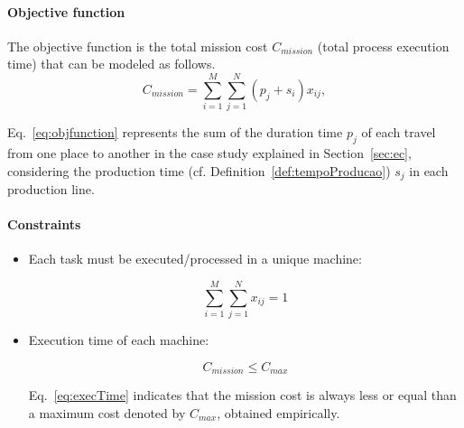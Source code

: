 \documentclass[conference]{IEEEtran}
\begin{document}
\paragraph{Objective function}

The objective function is the total mission cost $C_{mission}$ (total process execution time) that can be modeled as follows.
%
\begin{equation}
\label{eq:objfunction}
C_{mission}=\sum_{i=1}^{M}{\sum_{j=1}^{N}{
 (p_j+s_i)x_{ij}}},
\end{equation}

Eq.~\eqref{eq:objfunction} represents the sum of the duration time $p_j$ of each travel from one place to another in the case study explained in Section~\ref{sec:ec}, considering the production time (cf. Definition~\ref{def:tempoProducao}) $s_j$ in each production line.



\paragraph{Constraints}

\begin{itemize}
\item Each task must be executed/processed in a unique machine:

\begin{equation}
\label{eq:unicity}
\sum_{i=1}^{M}{\sum_{j=1}^{N}{x_{ij}}}=1
\end{equation}

\item Execution time of each machine:

\begin{equation}
\label{eq:execTime}
C_{mission}\leq C_{max}
\end{equation}

Eq.~\eqref{eq:execTime} indicates that the mission cost is always less or equal than a maximum cost denoted by $C_{max}$, obtained empirically.
\end{itemize}

\end{document}
